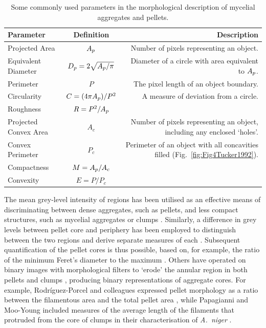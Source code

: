 \begin{table}[tb]
	\centering
	\footnotesize
	\caption{Some commonly used parameters in the morphological description of mycelial aggregates and pellets.}
	\label{tab:MorphParam}
	\begin{tabularx}{(\textwidth - 1cm)}{l c R}
		\toprule
		Parameter & Definition & Description \\ \midrule
		Projected Area & $A_p$ & Number of pixels representing an object.\\
		Equivalent Diameter & $D_p = 2\sqrt{A_p / \pi}$ & Diameter of a circle with area equivalent to $A_p$.\\
		Perimeter & $P$ & The pixel length of an object boundary.\\
		Circularity & $C= (4 \pi A_p)/P^2$ & A measure of deviation from a circle.\\
		Roughness & $R=P^2/A_p$ &\\
		Projected Convex Area & $A_c$ & Number of pixels representing an object, including any enclosed \lq holes'.\\
		Convex Perimeter & $P_c$ & Perimeter of an object with all concavities filled (Fig.~\ref{fig:Fig4Tucker1992}).\\
		Compactness & $M=A_p / A_c$ &\\
		Convexity & $E=P / P_c$ &\\
		\bottomrule
	\end{tabularx}
\end{table}

The mean grey-level intensity of regions has been utilised as an effective means of discriminating between dense aggregates, such as pellets, and less compact structures, such as mycelial aggregates or clumps \cite{papagianni2002,teng2009}. Similarly, a difference in grey levels between pellet core and periphery has been employed to distinguish between the two regions and derive separate measures of each \cite{cui1998b,truong2004}. Subsequent quantification of the pellet cores is thus possible, based on, for example, the ratio of the minimum Feret's diameter to the maximum \cite{hwang2004, jppark2002}. Others have operated on binary images with morphological filters to \lq erode' the annular region in both pellets \cite{koike2001,eypark2001} and clumps \cite{lucumi2005}, producing binary representations of aggregate cores. For example, Rodr\'{i}guez-Porcel and colleagues expressed pellet morphology as a ratio between the filamentous area and the total pellet area \cite{rodriguezporcel2005}, while Papagianni and Moo-Young included measures of the average length of the filaments that protruded from the core of clumps in their characterisation of \emph{A.~niger} \cite{papagianni2002}.

